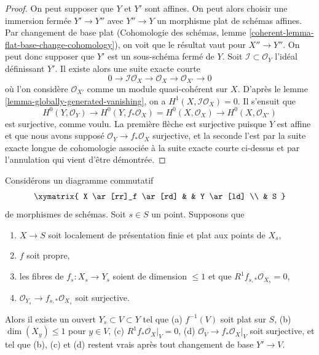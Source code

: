 \begin{proof}
On peut supposer que $Y$ et $Y'$ sont affines. On peut alors choisir une immersion
fermée $Y' \to Y''$ avec $Y'' \to Y$ un morphisme plat de schémas affines.
Par changement de base plat
(Cohomologie des schémas, lemme \ref{coherent-lemma-flat-base-change-cohomology}),
on voit que le résultat vaut pour $X'' \to Y''$.
On peut donc supposer que $Y'$ est un sous-schéma fermé de $Y$.
Soit $\mathcal{I} \subset \mathcal{O}_Y$ l'idéal définissant $Y'$.
Il existe alors une suite exacte courte
$$
0 \to \mathcal{I}\mathcal{O}_X \to
\mathcal{O}_X \to \mathcal{O}_{X'} \to 0
$$
où l'on considère $\mathcal{O}_{X'}$ comme un module quasi-cohérent sur $X$.
D'après le lemme \ref{lemma-globally-generated-vanishing},
on a $H^1(X, \mathcal{I}\mathcal{O}_X) = 0$.
Il s'ensuit que
$$
H^0(Y, \mathcal{O}_Y) \to
H^0(Y, f_*\mathcal{O}_X) = H^0(X, \mathcal{O}_X) \to
H^0(X, \mathcal{O}_{X'})
$$
est surjective, comme voulu. La première flèche est surjective puisque $Y$
est affine et que nous avons supposé $\mathcal{O}_Y \to f_*\mathcal{O}_X$
surjective, et la seconde l'est par la suite exacte longue de
cohomologie associée à la suite exacte courte ci-dessus et par
l'annulation qui vient d'être démontrée.
\end{proof}

\begin{lemma}
\label{lemma-h1-fibre-zero-h0-kappa}
Considérons un diagramme commutatif
$$
\xymatrix{
X \ar[rr]_f \ar[rd] & & Y \ar[ld] \\
& S
}
$$
de morphismes de schémas. Soit $s \in S$ un point. Supposons que
\begin{enumerate}
\item $X \to S$ soit localement de présentation finie et plat aux
points de $X_s$,
\item $f$ soit propre,
\item les fibres de $f_s : X_s \to Y_s$ soient de dimension $\leq 1$
et que $R^1f_{s, *}\mathcal{O}_{X_s} = 0$,
\item $\mathcal{O}_{Y_s} \to f_{s, *}\mathcal{O}_{X_s}$ soit surjective.
\end{enumerate}
Alors il existe un ouvert $Y_s \subset V \subset Y$ tel que
(a) $f^{-1}(V)$ soit plat sur $S$,
(b) $\dim(X_y) \leq 1$ pour $y \in V$,
(c) $R^1f_*\mathcal{O}_X|_V = 0$,
(d) $\mathcal{O}_V \to f_*\mathcal{O}_X|_V$
soit surjective,
et tel que (b), (c) et (d) restent vrais après tout changement de base $Y' \to V$.
\end{lemma}

